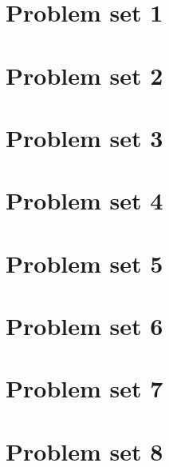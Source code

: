 \documentclass{article}
\newcommand{\addpset}[1]{
	\section{Problem set #1}
	
	\pagebreak
}
\begin{document}
\addpset{1}
\addpset{2}
\addpset{3}
\addpset{4}
\addpset{5}
\addpset{6}
\addpset{7}
\addpset{8}
\end{document}
